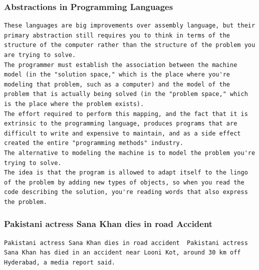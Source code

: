 \documentclass[BTech]{nitgoathesis}
\begin{document}
\subsubsection{Abstractions in Programming Languages}
\begin{lstlisting}[basicstyle=\scriptsize]
These languages are big improvements over assembly language, but their primary abstraction still requires you to think in terms of the structure of the computer rather than the structure of the problem you are trying to solve.
The programmer must establish the association between the machine model (in the "solution space," which is the place where you're modeling that problem, such as a computer) and the model of the problem that is actually being solved (in the "problem space," which is the place where the problem exists).
The effort required to perform this mapping, and the fact that it is extrinsic to the programming language, produces programs that are difficult to write and expensive to maintain, and as a side effect created the entire "programming methods" industry.
The alternative to modeling the machine is to model the problem you're trying to solve.
The idea is that the program is allowed to adapt itself to the lingo of the problem by adding new types of objects, so when you read the code describing the solution, you're reading words that also express the problem.
\end{lstlisting}
\subsubsection{Pakistani actress Sana Khan dies in road Accident}
\begin{lstlisting}[basicstyle=\scriptsize]
Pakistani actress Sana Khan dies in road accident  Pakistani actress Sana Khan has died in an accident near Looni Kot, around 30 km off Hyderabad, a media report said.
\end{lstlisting}


\end{document}
